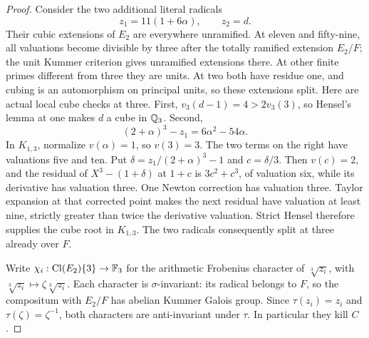 \begin{proof}
Consider the two additional literal radicals
\[
                 z_1=11(1+6\alpha),\qquad z_2=d.
\tag{A.173.11}
\]
Their cubic extensions of \(E_2\) are everywhere unramified.
At eleven and fifty-nine, all valuations become divisible by
three after the totally ramified extension \(E_2/F\); the
unit Kummer criterion gives unramified extensions there.
At other finite primes different from three they are units.
At two both have residue one, and cubing is an automorphism
on principal units, so these extensions split.
Here are actual local cube checks at three.  First,
\(v_3(d-1)=4>2v_3(3)\), so Hensel's lemma at one makes
\(d\) a cube in \(\mathbb Q_3\).  Second,
\[
             (2+\alpha)^3-z_1=6\alpha^2-54\alpha.
\tag{A.173.12}
\]
In \(K_{1,3}\), normalize \(v(\alpha)=1\), so \(v(3)=3\).
The two terms on the right have valuations five and ten.
Put \(\delta=z_1/(2+\alpha)^3-1\) and \(c=\delta/3\).
Then \(v(c)=2\), and the residual of
\(X^3-(1+\delta)\) at \(1+c\) is \(3c^2+c^3\), of valuation
six, while its derivative has valuation three.
One Newton correction has valuation three.  Taylor expansion
at that corrected point makes the next residual have valuation
at least nine, strictly greater than twice the derivative
valuation.  Strict Hensel therefore supplies the cube root in
\(K_{1,3}\).  The two radicals consequently split at three
already over \(F\).

Write \(\chi_i:\operatorname{Cl}(E_2)\{3\}\to\mathbb F_3\)
for the arithmetic Frobenius character of \(\sqrt[3]{z_i}\),
with \(\sqrt[3]{z_i}\mapsto\zeta\sqrt[3]{z_i}\).
Each character is \(\sigma\)-invariant: its radical belongs
to \(F\), so the compositum with \(E_2/F\) has abelian
Kummer Galois group.  Since \(\tau(z_i)=z_i\) and
\(\tau(\zeta)=\zeta^{-1}\), both characters are anti-invariant
under \(\tau\).  In particular they kill \(C\).


\end{proof}

